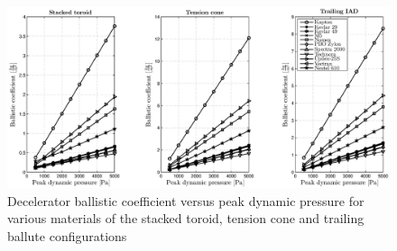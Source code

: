 \begin{figure}[H]
\hspace{-35mm}
\includegraphics[width = 1.35\textwidth]{Figure/all_mat.eps}
\caption{Decelerator ballistic coefficient versus peak dynamic pressure for various materials of the stacked toroid, tension cone and trailing ballute configurations}
\label{fig:all_mat}
\end{figure}


